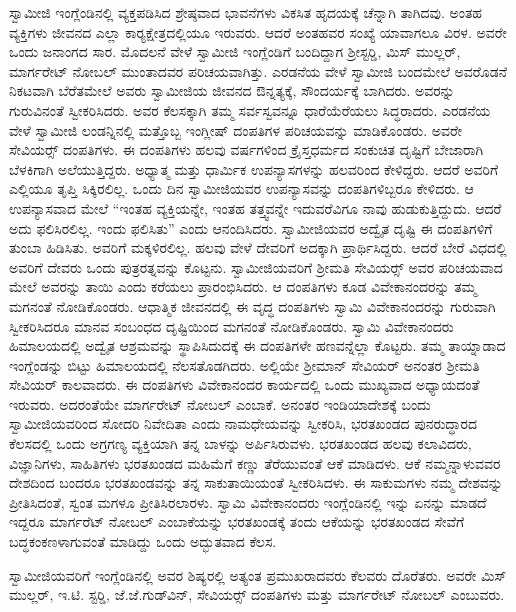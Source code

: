  ಸ್ವಾಮೀಜಿ ಇಂಗ್ಲೆಂಡಿನಲ್ಲಿ ವ್ಯಕ್ತಪಡಿಸಿದ ಶ್ರೇಷ್ಠವಾದ ಭಾವನೆಗಳು ವಿಕಸಿತ ಹೃದಯಕ್ಕೆ ಚೆನ್ನಾಗಿ ತಾಗಿದವು. ಅಂತಹ ವ್ಯಕ್ತಿಗಳು ಜೀವನದ ಎಲ್ಲಾ ಕಾರ‍್ಯಕ್ಷೇತ್ರದಲ್ಲಿಯೂ ಇರುವರು. ಆದರೆ ಅಂತಹವರ ಸಂಖ್ಯೆ ಯಾವಾಗಲೂ ವಿರಳ. ಅವರೇ ಒಂದು ಜನಾಂಗದ ಸಾರ. ಮೊದಲನೆ ವೇಳೆ ಸ್ವಾಮೀಜಿ ಇಂಗ್ಲೆಂಡಿಗೆ ಬಂದಿದ್ದಾಗ ಶ‍್ರೀಸ್ಟರ‍್ಡಿ, ಮಿಸ್ ಮುಲ್ಲರ್, ಮಾರ್ಗರೇಟ್ ನೋಬಲ್ ಮುಂತಾದವರ ಪರಿಚಯವಾಗಿತ್ತು. ಎರಡನೆಯ ವೇಳೆ ಸ್ವಾಮೀಜಿ ಬಂದಮೇಲೆ ಅವರೊಡನೆ ನಿಕಟವಾಗಿ ಬೆರೆತಮೇಲೆ ಅವರು ಸ್ವಾಮೀಜಿಯ ಜೀವನದ ಔನ್ನತ್ಯಕ್ಕೆ, ಸೌಂದರ್ಯಕ್ಕೆ ಬಾಗಿದರು. ಅವರನ್ನು ಗುರುವಿನಂತೆ ಸ್ವೀಕರಿಸಿದರು. ಅವರ ಕೆಲಸಕ್ಕಾಗಿ ತಮ್ಮ ಸರ್ವಸ್ವವನ್ನೂ ಧಾರೆಯೆರೆಯಲು ಸಿದ್ಧರಾದರು. ಎರಡನೆಯ ವೇಳೆ ಸ್ವಾಮೀಜಿ ಲಂಡನ್ನಿನಲ್ಲಿ ಮತ್ತೊಬ್ಬ ಇಂಗ್ಲೀಷ್ ದಂಪತಿಗಳ ಪರಿಚಯವನ್ನು ಮಾಡಿಕೊಂಡರು. ಅವರೇ ಸೇವಿಯರ್ಸ್‍‍ ದಂಪತಿಗಳು. ಈ ದಂಪತಿಗಳು ಹಲವು ವರ್ಷಗಳಿಂದ ಕ್ರೈಸ್ತಧರ್ಮದ ಸಂಕುಚಿತ ದೃಷ್ಟಿಗೆ ಬೇಜಾರಾಗಿ ಬೆಳಕಿಗಾಗಿ ಅಲೆಯುತ್ತಿದ್ದರು. ಅಧ್ಯಾತ್ಮ ಮತ್ತು ಧಾರ್ಮಿಕ ಉಪನ್ಯಾಸಗಳನ್ನು ಹಲವರಿಂದ ಕೇಳಿದ್ದರು. ಆದರೆ ಅವರಿಗೆ ಎಲ್ಲಿಯೂ ತೃಪ್ತಿ ಸಿಕ್ಕಿರಲಿಲ್ಲ. ಒಂದು ದಿನ ಸ್ವಾಮೀಜಿಯವರ ಉಪನ್ಯಾಸವನ್ನು ದಂಪತಿಗಳಿಬ್ಬರೂ ಕೇಳಿದರು. ಆ ಉಪನ್ಯಾಸವಾದ ಮೇಲೆ “ಇಂತಹ ವ್ಯಕ್ತಿಯನ್ನೇ, ಇಂತಹ ತತ್ತ್ವವನ್ನೇ ಇದುವರೆವಿಗೂ ನಾವು ಹುಡುಕುತ್ತಿದ್ದುದು. ಆದರೆ ಅದು ಫಲಿಸಿರಲಿಲ್ಲ. ಇಂದು ಫಲಿಸಿತು” ಎಂದು ಆನಂದಿಸಿದರು. ಸ್ವಾಮೀಜಿಯವರ ಅದ್ವೈತ ದೃಷ್ಟಿ ಈ ದಂಪತಿಗಳಿಗೆ ತುಂಬಾ ಹಿಡಿಸಿತು. ಅವರಿಗೆ ಮಕ್ಕಳಿರಲಿಲ್ಲ. ಹಲವು ವೇಳೆ ದೇವರಿಗೆ ಅದಕ್ಕಾಗಿ ಪ್ರಾರ್ಥಿಸಿದ್ದರು. ಆದರೆ ಬೇರೆ ವಿಧದಲ್ಲಿ ಅವರಿಗೆ ದೇವರು ಒಂದು ಪುತ್ರರತ್ನವನ್ನು ಕೊಟ್ಟನು. ಸ್ವಾಮೀಜಿಯವರಿಗೆ ಶ‍್ರೀಮತಿ ಸೇವಿಯರ್ಸ್‍‍ ಅವರ ಪರಿಚಯವಾದ ಮೇಲೆ ಅವರನ್ನು ತಾಯಿ ಎಂದು ಕರೆಯಲು ಪ್ರಾರಂಭಿಸಿದರು. ಆ ದಂಪತಿಗಳು ಕೂಡ ವಿವೇಕಾನಂದರನ್ನು ತಮ್ಮ ಮಗನಂತೆ ನೋಡಿಕೊಂಡರು. ಆಧಾತ್ಮಿಕ ಜೀವನದಲ್ಲಿ ಈ ವೃದ್ಧ ದಂಪತಿಗಳು ಸ್ವಾಮಿ ವಿವೇಕಾನಂದರನ್ನು ಗುರುವಾಗಿ ಸ್ವೀಕರಿಸಿದರೂ ಮಾನವ ಸಂಬಂಧದ ದೃಷ್ಟಿಯಿಂದ ಮಗನಂತೆ ನೋಡಿಕೊಂಡರು. ಸ್ವಾಮಿ ವಿವೇಕಾನಂದರು ಹಿಮಾಲಯದಲ್ಲಿ ಅದ್ವೈತ ಆಶ್ರಮವನ್ನು ಸ್ಥಾಪಿಸಿದುದಕ್ಕೆ ಈ ದಂಪತಿಗಳೇ ಹಣವನ್ನೆಲ್ಲಾ ಕೊಟ್ಟರು. ತಮ್ಮ ತಾಯ್ನಾಡಾದ ಇಂಗ್ಲೆಂಡನ್ನು ಬಿಟ್ಟು ಹಿಮಾಲಯದಲ್ಲಿ ನೆಲಸತೊಡಗಿದರು. ಅಲ್ಲಿಯೇ ಶ‍್ರೀಮಾನ್ ಸೇವಿಯರ್ ಅನಂತರ ಶ‍್ರೀಮತಿ ಸೇವಿಯರ್ ಕಾಲವಾದರು. ಈ ದಂಪತಿಗಳು ವಿವೇಕಾನಂದರ ಕಾರ್ಯದಲ್ಲಿ ಒಂದು ಮುಖ್ಯವಾದ ಅಧ್ಯಾಯದಂತೆ ಇರುವರು. ಅದರಂತೆಯೇ ಮಾರ್ಗರೇಟ್ ನೋಬಲ್ ಎಂಬಾಕೆ. ಅನಂತರ ಇಂಡಿಯಾದೇಶಕ್ಕೆ ಬಂದು ಸ್ವಾಮೀಜಿಯವರಿಂದ ಸೋದರಿ ನಿವೇದಿತಾ ಎಂದು ನಾಮಧೇಯವನ್ನು ಸ್ವೀಕರಿಸಿ, ಭರತಖಂಡದ ಪುನರುದ್ಧಾರದ ಕೆಲಸದಲ್ಲಿ ಒಂದು ಅಗ್ರಗಣ್ಯ ವ್ಯಕ್ತಿಯಾಗಿ ತನ್ನ ಬಾಳನ್ನು ಅರ್ಪಿಸಿರುವಳು. ಭರತಖಂಡದ ಹಲವು ಕಲಾವಿದರು, ವಿಜ್ಞಾನಿಗಳು, ಸಾಹಿತಿಗಳು ಭರತಖಂಡದ ಮಹಿಮೆಗೆ ಕಣ್ಣು ತೆರೆಯುವಂತೆ ಆಕೆ ಮಾಡಿದಳು. ಆಕೆ ನಮ್ಮನ್ನಾಳುವವರ ದೇಶದಿಂದ ಬಂದರೂ ಭರತಖಂಡವನ್ನು ತನ್ನ ಸಾಕುತಾಯಿಯಂತೆ ಸ್ವೀಕರಿಸಿದಳು. ಈ ಸಾಕುಮಗಳು ನಮ್ಮ ದೇಶವನ್ನು ಪ್ರೀತಿಸಿದಂತೆ, ಸ್ವಂತ ಮಗಳೂ ಪ್ರೀತಿಸಿರಲಾರಳು. ಸ್ವಾಮಿ ವಿವೇಕಾನಂದರು ಇಂಗ್ಲೆಂಡಿನಲ್ಲಿ ಇನ್ನು ಏನನ್ನು ಮಾಡದೆ ಇದ್ದರೂ ಮಾರ್ಗರೆಟ್ ನೋಬಲ್ ಎಂಬಾಕೆಯನ್ನು ಭರತಖಂಡಕ್ಕೆ ತಂದು ಆಕೆಯನ್ನು ಭರತಖಂಡದ ಸೇವೆಗೆ ಬದ್ಧಕಂಕಣಳಾಗುವಂತೆ ಮಾಡಿದ್ದು ಒಂದು ಅದ್ಭುತವಾದ ಕೆಲಸ. 

 ಸ್ವಾಮೀಜಿಯವರಿಗೆ ಇಂಗ್ಲೆಂಡಿನಲ್ಲಿ ಅವರ ಶಿಷ್ಯರಲ್ಲಿ ಅತ್ಯಂತ ಪ್ರಮುಖರಾದವರು ಕೆಲವರು ದೊರೆತರು. ಅವರೇ ಮಿಸ್ ಮುಲ್ಲರ್, ಇ.ಟಿ. ಸ್ಟರ‍್ಡಿ, ಜೆ.ಜೆ.ಗುಡ್‍ವಿನ್, ಸೇವಿಯರ್ಸ್‍‍ ದಂಪತಿಗಳು ಮತ್ತು ಮಾರ್ಗರೇಟ್ ನೋಬಲ್ ಎಂಬುವರು. 

